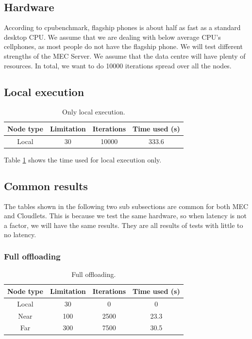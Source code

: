 \subsection{Hardware}
According to cpubenchmark\cite{noauthor_passmark_nodate}, flagship phones is about half as fast as a standard desktop CPU. We assume that we are dealing with below average CPU's cellphones, as most people do not have the flagship phone. We will test different strengths of the MEC Server. We assume that the data centre will have plenty of resources. In total, we want to do 10000 iterations spread over all the nodes.




\subsection{Local execution}
\begin{table}[h!]
    \centering
    \begin{tabular}[c]{|c|c|c|c|}
        \hline
        Node type & Limitation & Iterations & Time used (s) \\
        \hline
        \hline
        Local & 30 & 10000 & 333.6 \\
        \hline
    \end{tabular}
    \caption{Only local execution.}
    \label{tab:MEC_local_execution}
\end{table}
Table \ref{tab:MEC_local_execution} shows the time used for local execution only.


\subsection{Common results}
The tables shown in the following two sub subsections are common for both MEC and Cloudlets. This is because we test the same hardware, so when latency is not a factor, we will have the same results. They are all results of tests with little to no latency.

\subsubsection{Full offloading}
\begin{table}[h!]
    \centering
    \begin{tabular}[c]{|c|c|c|c|}
        \hline
        Node type & Limitation & Iterations & Time used (s)\\
        \hline
        \hline
        Local & 30 & 0 & 0 \\
        \hline
        Near & 100 & 2500 & 23.3 \\
        \hline
        Far & 300 & 7500 & 30.5 \\
        \hline
    \end{tabular}
    \caption{Full offloading.}
    \label{tab:MEC_full_offloading}
\end{table}

